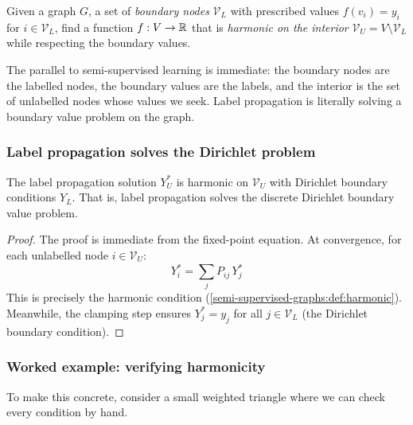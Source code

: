 \begin{notechapter}
\begin{definition}
\label{semi-supervised-graphs:def:dirichlet}
Given a graph $G$, a set of \emph{boundary nodes} $\mathcal{V}_L$ with
prescribed values $f(v_i) = y_i$ for $i \in \mathcal{V}_L$, find a function
$f : V \to \mathbb{R}$ that is \emph{harmonic on the interior}
$\mathcal{V}_U = V \setminus \mathcal{V}_L$ while respecting the boundary
values.
\end{definition}

The parallel to semi-supervised learning is immediate: the boundary
nodes are the labelled nodes, the boundary values are the labels, and the
interior is the set of unlabelled nodes whose values we seek. Label
propagation is literally solving a boundary value problem on the graph.

\subsubsection*{Label propagation solves the Dirichlet problem}

\begin{proposition}
\label{semi-supervised-graphs:prop:harmonic}
The label propagation solution $Y_U^*$ is harmonic on $\mathcal{V}_U$ with
Dirichlet boundary conditions $Y_L$. That is, label propagation solves the
discrete Dirichlet boundary value problem.
\end{proposition}

\begin{proof}
The proof is immediate from the fixed-point equation. At convergence, for
each unlabelled node $i \in \mathcal{V}_U$:
\[
Y_i^* = \sum_j P_{ij}\,Y_j^*
\]
This is precisely the harmonic condition
(\cref{semi-supervised-graphs:def:harmonic}). Meanwhile, the clamping step ensures
$Y_j^* = y_j$ for all $j \in \mathcal{V}_L$ (the Dirichlet boundary
condition).
\end{proof}

\subsubsection*{Worked example: verifying harmonicity}

To make this concrete, consider a small weighted triangle where we can check
every condition by hand.

\begin{figure}[ht]
\centering
{}
\end{figure}
\end{notechapter}
